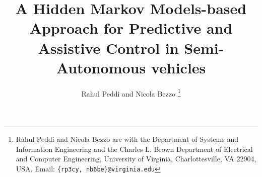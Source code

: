 \documentclass[letterpaper, 10 pt, conference]{ieeeconf}  %
\begin{document}
%
\title{\LARGE \bf A Hidden Markov Models-based Approach for Predictive and Assistive Control in Semi-Autonomous vehicles}
\author{Rahul Peddi and Nicola Bezzo%
\thanks{Rahul Peddi and Nicola Bezzo are with the Department of Systems and Information Engineering and the Charles L. Brown Department of Electrical and Computer Engineering, University of Virginia, Charlottesville, VA 22904, USA. Email: {\tt \{rp3cy, nb6be\}@virginia.edu}}
}





\maketitle

\begin{abstract}
\end{abstract}





%
\IEEEpeerreviewmaketitle
\end{document}
